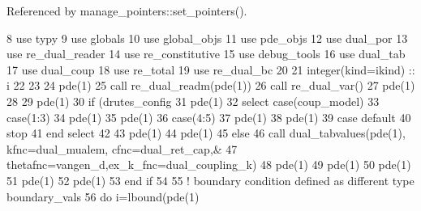 Referenced by manage\+\_\+pointers\+::set\+\_\+pointers().


\begin{DoxyCode}
8       \textcolor{keywordtype}{use }typy
9       \textcolor{keywordtype}{use }globals
10       \textcolor{keywordtype}{use }global_objs
11       \textcolor{keywordtype}{use }pde_objs
12       \textcolor{keywordtype}{use }dual_por
13       \textcolor{keywordtype}{use }re_dual_reader
14       \textcolor{keywordtype}{use }re_constitutive
15       \textcolor{keywordtype}{use }debug_tools
16       \textcolor{keywordtype}{use }dual_tab
17       \textcolor{keywordtype}{use }dual_coup
18       \textcolor{keywordtype}{use }re_total
19       \textcolor{keywordtype}{use }re_dual_bc
20 
21       \textcolor{keywordtype}{integer(kind=ikind)} :: i
22 
23            
24       pde(1)%
25       \textcolor{keyword}{call }re_dual_readm(pde(1))
26       \textcolor{keyword}{call }re_dual_var() 
27       pde(1)%
28 
29       pde(1)%
30       \textcolor{keywordflow}{if} (drutes_config%
31             pde(1)%
32             \textcolor{keywordflow}{select case}(coup_model)
33              \textcolor{keywordflow}{case}(1:3)
34                pde(1)%
35                pde(1)%
36              \textcolor{keywordflow}{case}(4:5)
37                pde(1)%
38                pde(1)%
39 \textcolor{keywordflow}{             case default}
40              stop
41 \textcolor{keywordflow}{            end select}
42             
43             pde(1)%
44             pde(1)%
45       \textcolor{keywordflow}{else}
46             \textcolor{keyword}{call }dual_tabvalues(pde(1), kfnc=dual_mualem, cfnc=dual_ret_cap,&
47             thetafnc=vangen_d,ex\_k\_fnc=dual_coupling_k)
48             pde(1)%
49             pde(1)%
50             pde(1)%
51             pde(1)%
52             pde(1)%
53 \textcolor{keywordflow}{      end if}
54       
55       \textcolor{comment}{! boundary condition defined as different type boundary\_vals}
56       \textcolor{keywordflow}{do} i=lbound(pde(1)%

\end{DoxyCode}
